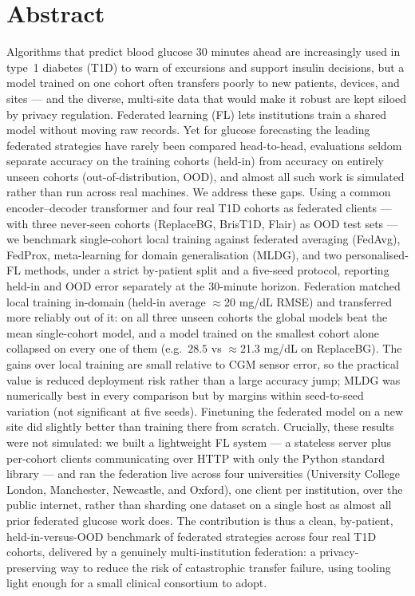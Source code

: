 \documentclass[10pt,letterpaper]{article}
\begin{document}
\section*{Abstract}
Algorithms that predict blood glucose 30 minutes ahead are increasingly used in
type~1 diabetes (T1D) to warn of excursions and support insulin decisions, but a
model trained on one cohort often transfers poorly to new patients, devices, and
sites --- and the diverse, multi-site data that would make it robust are kept
siloed by privacy regulation. Federated learning (FL) lets institutions train a
shared model without moving raw records. Yet for glucose forecasting the leading
federated strategies have rarely been compared head-to-head, evaluations seldom
separate accuracy on the training cohorts (held-in) from accuracy on entirely
unseen cohorts (out-of-distribution, OOD), and almost all such work is simulated
rather than run across real machines. We address these gaps. Using a common
encoder--decoder transformer and four real T1D cohorts as federated clients ---
with three never-seen cohorts (ReplaceBG, BrisT1D, Flair) as OOD test sets --- we
benchmark
single-cohort local training against federated averaging (FedAvg), FedProx,
meta-learning for domain generalisation (MLDG), and two personalised-FL methods,
under a strict by-patient split and a five-seed protocol, reporting held-in and
OOD error separately at the 30-minute horizon. Federation matched local training
in-domain (held-in average $\approx$20 mg/dL RMSE) and transferred more reliably
out of it: on all three unseen cohorts the global models beat the mean
single-cohort model, and a model trained on the smallest
cohort alone collapsed on every one of them (e.g.\ $28.5$ vs $\approx$21.3 mg/dL
on ReplaceBG). The gains over local training are small relative to CGM sensor
error, so the practical value is reduced deployment risk rather than a large
accuracy jump; MLDG was numerically best in every comparison but by margins
within seed-to-seed variation (not significant at five seeds). Finetuning the federated model on a new site
did slightly better than training there from scratch. Crucially, these results
were not simulated: we built a lightweight FL system --- a stateless server plus
per-cohort clients communicating over HTTP with only the Python standard library
--- and ran the federation live across four universities (University College
London, Manchester, Newcastle, and Oxford), one client per institution, over the
public internet, rather than sharding one dataset on a single host as almost all
prior federated glucose work does. The contribution is thus a clean, by-patient,
held-in-versus-OOD benchmark of federated strategies across four real T1D cohorts,
delivered by a genuinely multi-institution federation: a privacy-preserving way to
reduce the risk of catastrophic transfer failure, using tooling light enough for a
small clinical consortium to adopt.
\end{document}
